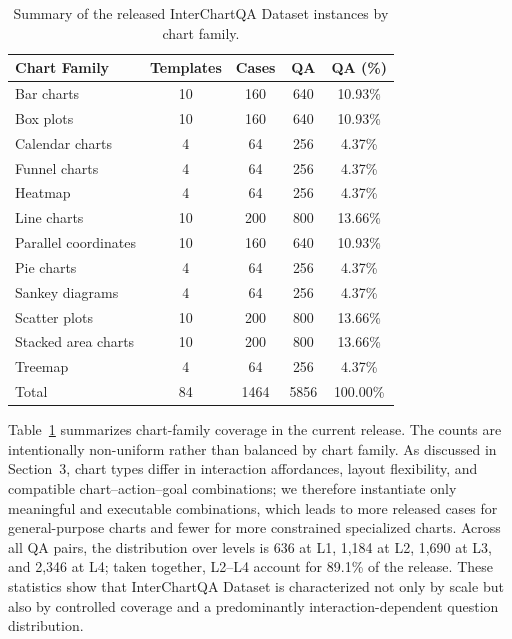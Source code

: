 \documentclass[review,journal,hideappendix]{vgtc} %
\newcommand{\dataset}{InterChartQA}
\begin{document}
\begin{table}[h]
  \centering
  \caption{
    Summary of the released \dataset{} Dataset instances by chart family.
  }
  \label{tab:dataset_summary}
  \begin{tabular}{lcccc}
    \toprule
    Chart Family & Templates & Cases & QA & QA (\%) \\
    \midrule
    Bar charts           & 10 & 160 &  640 & 10.93\% \\
    Box plots            & 10 & 160 &  640 & 10.93\% \\
    Calendar charts      &  4 &  64 &  256 &  4.37\% \\
    Funnel charts        &  4 &  64 &  256 &  4.37\% \\
    Heatmap              &  4 &  64 &  256 &  4.37\% \\
    Line charts          & 10 & 200 &  800 & 13.66\% \\
    Parallel coordinates & 10 & 160 &  640 & 10.93\% \\
    Pie charts           &  4 &  64 &  256 &  4.37\% \\
    Sankey diagrams      &  4 &  64 &  256 &  4.37\% \\
    Scatter plots        & 10 & 200 &  800 & 13.66\% \\
    Stacked area charts  & 10 & 200 &  800 & 13.66\% \\
    Treemap              &  4 &  64 &  256 &  4.37\% \\
    \midrule
    Total                & 84 & 1464 & 5856 & 100.00\% \\
    \bottomrule
  \end{tabular}
\end{table}

Table~\ref{tab:dataset_summary} summarizes chart-family coverage in the current release. The counts are intentionally non-uniform rather than balanced by chart family. As discussed in Section~3, chart types differ in interaction affordances, layout flexibility, and compatible chart--action--goal combinations; we therefore instantiate only meaningful and executable combinations, which leads to more released cases for general-purpose charts and fewer for more constrained specialized charts. Across all QA pairs, the distribution over levels is 636 at L1, 1,184 at L2, 1,690 at L3, and 2,346 at L4; taken together, L2--L4 account for 89.1\% of the release. These statistics show that \dataset{} Dataset is characterized not only by scale but also by controlled coverage and a predominantly interaction-dependent question distribution.
\end{document}
